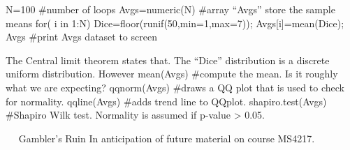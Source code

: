 N=100				#number of loops
Avgs=numeric(N)		#array “Avgs” store the sample means
for( i in 1:N)
	{	Dice=floor(runif(50,min=1,max=7));	Avgs[i]=mean(Dice);
	}
Avgs				#print Avgs dataset to screen

The Central limit theorem states that.
The “Dice” distribution is a discrete uniform distribution. However 
mean(Avgs)			#compute the mean. Is it roughly what we are expecting?
qqnorm(Avgs)			#draws a QQ plot that is used to check for normality.
qqline(Avgs)			#adds trend line to QQplot.
shapiro.test(Avgs)		#Shapiro Wilk test. Normality is assumed if p-value > 0.05.
			
 
Gambler’s Ruin
In anticipation of future material on course MS4217.
 
